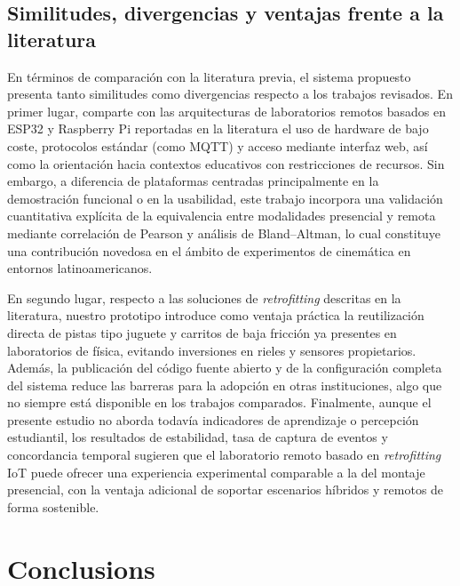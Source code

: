 \documentclass[journal,article,submit,pdftex]{Definitions/mdpi}
\begin{document}
\subsection{Similitudes, divergencias y ventajas frente a la literatura}

En t\'erminos de comparaci\'on con la literatura previa, el sistema propuesto presenta tanto similitudes como divergencias respecto a los trabajos revisados. En primer lugar, comparte con las arquitecturas de laboratorios remotos basados en ESP32 y Raspberry Pi reportadas en la literatura el uso de hardware de bajo coste, protocolos est\'andar (como MQTT) y acceso mediante interfaz web, as\'i como la orientaci\'on hacia contextos educativos con restricciones de recursos. Sin embargo, a diferencia de plataformas centradas principalmente en la demostraci\'on funcional o en la usabilidad, este trabajo incorpora una validaci\'on cuantitativa expl\'icita de la equivalencia entre modalidades presencial y remota mediante correlaci\'on de Pearson y an\'alisis de Bland--Altman, lo cual constituye una contribuci\'on novedosa en el \'ambito de experimentos de cinem\'atica en entornos latinoamericanos.

En segundo lugar, respecto a las soluciones de \textit{retrofitting} descritas en la literatura, nuestro prototipo introduce como ventaja pr\'actica la reutilizaci\'on directa de pistas tipo juguete y carritos de baja fricci\'on ya presentes en laboratorios de f\'isica, evitando inversiones en rieles y sensores propietarios. Adem\'as, la publicaci\'on del c\'odigo fuente abierto y de la configuraci\'on completa del sistema reduce las barreras para la adopci\'on en otras instituciones, algo que no siempre est\'a disponible en los trabajos comparados. Finalmente, aunque el presente estudio no aborda todav\'ia indicadores de aprendizaje o percepci\'on estudiantil, los resultados de estabilidad, tasa de captura de eventos y concordancia temporal sugieren que el laboratorio remoto basado en \textit{retrofitting} IoT puede ofrecer una experiencia experimental comparable a la del montaje presencial, con la ventaja adicional de soportar escenarios h\'ibridos y remotos de forma sostenible.

\section{Conclusions}
\end{document}
